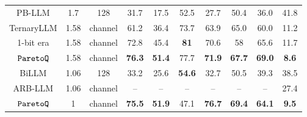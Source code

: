 \begin{table}[t]
{\begin{tabular}{c:c:c:cccccc:c}
 \midrule
PB-LLM & 1.7 & 128 & 31.7 & 17.5 & 52.5 & 27.7 & 50.4 & 36.0 & 41.8 \\
TernaryLLM & 1.58 & channel & 61.2 & 36.4 & 73.7 & 63.9 & 65.0 & 60.0 & 11.2 \\
1-bit era & 1.58 & channel & 72.8 & 45.4 & \textbf{81} & 70.6 & 58 & 65.6 & 11.7 \\
$\texttt{ParetoQ}{}$ & 1.58 & channel & \textbf{76.3} & \textbf{51.4} & 77.7 & \textbf{71.9} & \textbf{67.7} & \textbf{69.0} & \textbf{8.6} \\
 \midrule
BiLLM & 1.06 & 128 & 33.2 & 25.6 & \textbf{54.6} & 32.7 & 50.5 & 39.3 & 38.5 \\

ARB-LLM & 1.06 & channel & -- & -- & -- & -- & -- & -- & 27.4 \\
$\texttt{ParetoQ}{}$ & 1 & channel & \textbf{75.5} & \textbf{51.9} & 47.1 & \textbf{76.7} & \textbf{69.4}& \textbf{64.1} & \textbf{9.5} \\
\hline\hline
\end{tabular}}
\vspace{-1em}
\end{table}